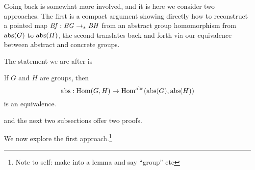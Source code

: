 Going back is somewhat more involved, and it is here we consider two approaches.
The first is a compact argument showing directly how to reconstruct a pointed map $\mathit{B}\mathit{f}:\mathit{B}\mathit{G}\to_\ast\mathit{B}\mathit{H}$ from an abstract group homomorphism from $\mathrm{abs}(G)$ to $\mathrm{abs}(H)$, the second translates back and forth via our equivalence between abstract and concrete groups.



The statement we are after is


\begin{lemma}
  \label{lem:homomabstrconcr}
  If $G$ and $H$ are groups, then 
$$\abstr:\Hom(G,H)\to\Hom^\abstr(\abstr(G),\abstr(H))$$
is an equivalence.
\end{lemma}
and the next two subsections offer two proofs.



\label{sec:thierrysdelooping}
We now explore the first approach.\footnote{Note to self: make into a lemma and say ``group'' etc}

